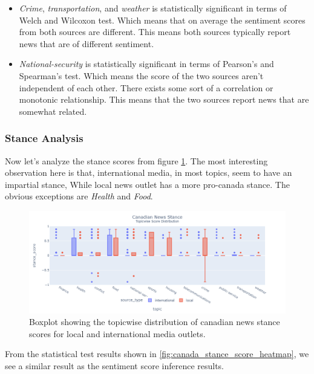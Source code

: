 \documentclass{article}
\theoremstyle{mytheoremstyle}
\theoremstyle{mytheoremstyle}
\theoremstyle{myproblemstyle}
\begin{document}
    \begin{itemize}
        \item \emph{Crime}, \emph{transportation}, and \emph{weather} is statistically significant in terms of Welch and Wilcoxon test. Which means that on average the sentiment scores from both sources are different. This means both sources typically report news that are of different sentiment.
        \item \emph{National-security} is statistically significant in terms of Pearson's and Spearman's test. Which means the score of the two sources aren't independent of each other. There exists some sort of a correlation or monotonic relationship. This means that the two sources report news that are somewhat related. 
    \end{itemize}

    \subsubsection{Stance Analysis}

    Now let's analyze the stance scores from figure \ref{fig:canada_stance_score_boxplot}. The most interesting observation here is that, international media, in most topics, seem to have an impartial stance, While local news outlet has a more pro-canada stance. The obvious exceptions are \emph{Health} and \emph{Food}.
    
    \begin{figure}[hp]
        \centering
        \includegraphics[width=\linewidth]{../images/plots/Canada/canada_boxplot_stance.png}
        \caption{Boxplot showing the topicwise distribution of canadian news stance scores for local and international media outlets.}
        \label{fig:canada_stance_score_boxplot}
    \end{figure}

    From the statistical test results shown in \ref{fig:canada_stance_score_heatmap}, we see a similar result as the sentiment score inference results. 
\end{document}
